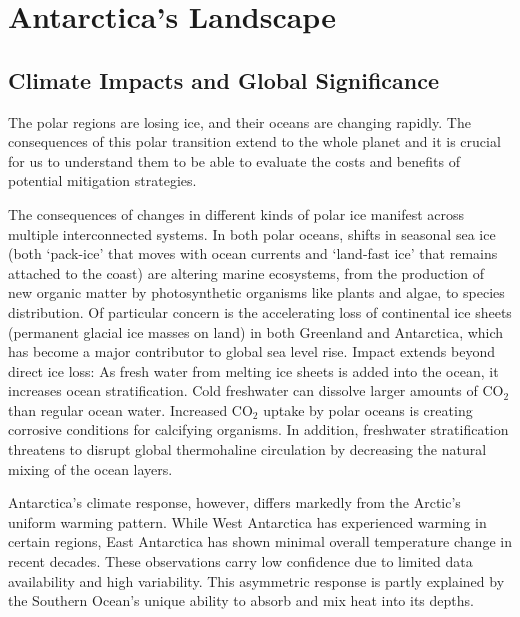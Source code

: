 \chapter{Antarctica's Landscape}\label{why}
\section*{Climate Impacts and Global Significance}

The polar regions are losing ice, and their oceans are changing rapidly\cite{O_C_in_changingClimate}. The consequences of this polar transition extend to the whole planet and it is crucial for us to understand them to be able to evaluate the costs and benefits of potential mitigation strategies. 

The consequences of changes in different kinds of polar ice manifest across multiple interconnected systems. In both polar oceans, shifts in seasonal sea ice (both `pack-ice' that moves with ocean currents and `land-fast ice' that remains attached to the coast\cite{SeaIce}) are altering marine ecosystems, from the production of new organic matter by photosynthetic organisms like plants and algae, to species distribution\cite{O_C_in_changingClimate}. Of particular concern is the accelerating loss of continental ice sheets (permanent glacial ice masses on land) in both Greenland and Antarctica, which has become a major contributor to global sea level rise\cite{O_C_in_changingClimate}. Impact extends beyond direct ice loss: As fresh water from melting ice sheets is added into the ocean, it increases ocean stratification. Cold freshwater can dissolve larger amounts of $\mathrm{CO_2}$ than regular ocean water. Increased $\mathrm{CO_2}$ uptake by polar oceans is creating corrosive conditions for calcifying organisms\cite{O_C_in_changingClimate}. In addition, freshwater stratification threatens to disrupt global thermohaline circulation\cite{Jacobs_2004} by decreasing the natural mixing of the ocean layers.

Antarctica's climate response, however, differs markedly from the Arctic's uniform warming pattern. While West Antarctica has experienced warming in certain regions, East Antarctica has shown minimal overall temperature change in recent decades\cite{O_C_in_changingClimate}. These observations carry low confidence due to limited data availability and high variability\cite{O_C_in_changingClimate}. This asymmetric response is partly explained by the Southern Ocean's unique ability to absorb and mix heat into its depths\cite{L_T_C_C}.
 
